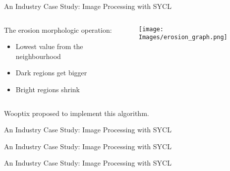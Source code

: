 \begin{frame}{An Industry Case Study: Image Processing with SYCL}
  \begin{columns}
    \begin{column}{0.48\textwidth}
      The erosion morphologic operation:
        \begin{itemize}
          \item Lowest value from the neighbourhood
          \item Dark regions get bigger
          \item Bright regions shrink
        \end{itemize}
      \end{column}
      \begin{column}{0.48\textwidth}
        \texttt{[image: Images/erosion\_graph.png]}
      \end{column}
    \end{columns}
    Wooptix proposed to implement this algorithm.
\end{frame}
\begin{frame}{An Industry Case Study: Image Processing with SYCL}
  
\end{frame}
\begin{frame}{An Industry Case Study: Image Processing with SYCL}
  
\end{frame}
\begin{frame}{An Industry Case Study: Image Processing with SYCL}
  
\end{frame}
